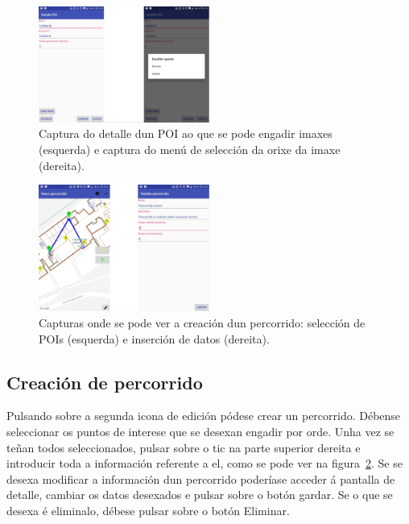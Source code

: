 \begin{figure}[H]
	\begin{center}
		\includegraphics[width=0.5\textwidth]{figures/android/mapaEngadirImaxe}
		\caption{Captura do detalle dun POI ao que se pode engadir imaxes (esquerda) e captura do menú de selección da orixe da imaxe (dereita).}
		\label{fig:mapaEngadirImaxe}
	\end{center}
\end{figure}

\begin{figure}[h]
	\begin{center}
		\includegraphics[width=0.5\textwidth]{figures/android/mapaCrearPercorrido}
		\caption{Capturas onde se pode ver a creación dun percorrido: selección de POIs (esquerda) e inserción de datos (dereita).}
		\label{fig:mapaCrearPercorrido}
	\end{center}
\end{figure}

\subsection{Creación de percorrido}
Pulsando sobre a segunda icona de edición pódese crear un percorrido. Débense seleccionar os puntos de interese que se desexan engadir por orde. Unha vez se teñan todos seleccionados, pulsar sobre o tic na parte superior dereita e introducir toda a información referente a el, como se pode ver na figura~\ref{fig:mapaCrearPercorrido}. Se se desexa modificar a información dun percorrido poderíase acceder á pantalla de detalle, cambiar os datos desexados e pulsar sobre o botón gardar. Se o que se desexa é eliminalo, débese pulsar sobre o botón Eliminar.

